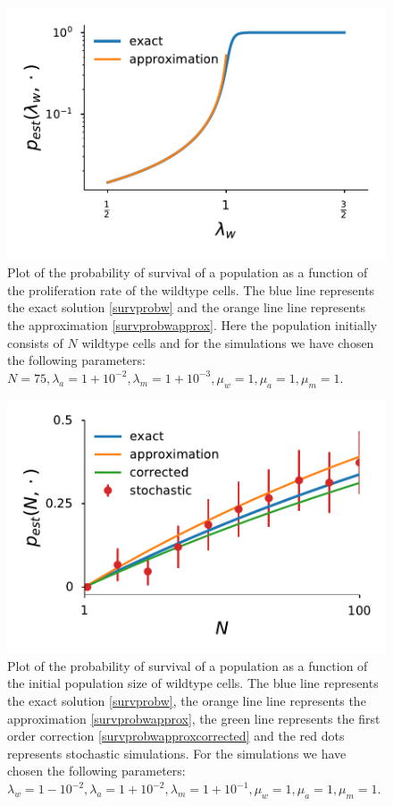 \documentclass[11pt,a4paper]{article}
\begin{document}
\begin{figure}[!t]
 \vspace*{1\baselineskip}
\includegraphics[width=1\textwidth]{SurvPlot.pdf}
\caption{Plot of the probability of survival of a population as a function of the proliferation rate of the wildtype cells. The blue line represents the exact solution \eqref{survprobw} and the orange line line represents the approximation \eqref{survprobwapprox}. Here the population initially consists of $N$ wildtype cells and for the simulations we have chosen the following parameters: $N=75, \lambda_a=1+10^{-2},\lambda_m=1+10^{-3},\mu_w=1,\mu_a=1,\mu_m=1.$}
\label{SurvPlot}
\end{figure}

\begin{figure}[!t]
 \vspace*{1\baselineskip}
\includegraphics[width=1\textwidth]{SurvPlotNData.pdf}
\caption{Plot of the probability of survival of a population as a function of the initial population size of wildtype cells. The blue line represents the exact solution \eqref{survprobw}, the orange line line represents the approximation \eqref{survprobwapprox}, the green line represents the first order correction \eqref{survprobwapproxcorrected} and the red dots represents stochastic simulations. For the simulations we have chosen the following parameters: $\lambda_w=1-10^{-2}, \lambda_a=1+10^{-2},\lambda_m=1+10^{-1},\mu_w=1,\mu_a=1,\mu_m=1.$}
\label{SurvPlotNData}
\end{figure}
\end{document}
